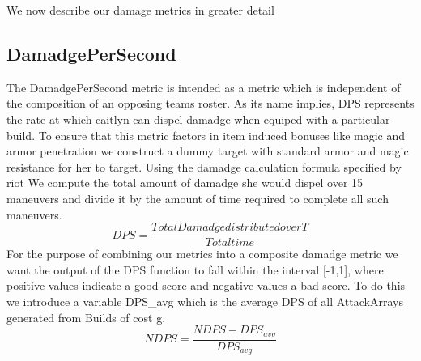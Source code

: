 \documentclass{article}
\begin{document}
We now describe our damage metrics in greater detail

\subsection{DamadgePerSecond}
The DamadgePerSecond metric is intended as a metric which is independent of the composition of an opposing teams roster.  As its name implies, DPS represents the rate at which caitlyn can dispel damadge when equiped with a particular build.  To ensure that this metric factors in item induced bonuses like magic and armor penetration we construct a dummy target with standard armor and magic resistance for her to target.  Using the damadge calculation formula specified by riot We compute the total amount of damadge she would dispel over 15 maneuvers and divide it by the amount of time required to complete all such maneuvers.  
\begin{equation}
DPS = \frac{Total Damadge distributed over T}{Total time}
\end{equation}
For the purpose of combining our metrics into a composite damadge metric we want the output of the DPS function to fall within the interval [-1,1], where positive values indicate a good score and negative values a bad score.  To do this we introduce a variable DPS_{avg} which is the average DPS of all AttackArrays generated from Builds of cost  g.\\
\begin{equation}
NDPS = \frac{NDPS - DPS_{avg}}{DPS_{avg}}
\end{equation}
\end{document}
